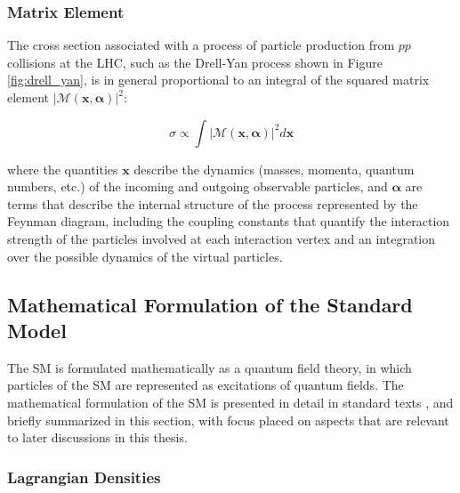 \subsubsection{Matrix Element}


The cross section associated with a process of particle production from \(pp\) collisions at the LHC, such as the Drell-Yan process shown in Figure \ref{fig:drell_yan}, is in general proportional to an integral of the squared matrix element \(|\mathcal{M(\boldsymbol{x}, \boldsymbol{\alpha})}|^2\):

\begin{equation}
\label{eq:matrix_element}
\sigma \propto \int|\mathcal{M(\boldsymbol{x}, \boldsymbol{\alpha})}|^2 d\boldsymbol{x} 
\end{equation}

\noindent where the quantities \(\boldsymbol{x}\) describe the dynamics (masses, momenta, quantum numbers, etc.) of the incoming and outgoing observable particles, and \(\boldsymbol{\alpha}\) are terms that describe the internal structure of the process represented by the Feynman diagram, including the coupling constants that quantify the interaction strength of the particles involved at each interaction vertex and an integration over the possible dynamics of the virtual particles. 

\subsection{Mathematical Formulation of the Standard Model}
\label{sec:sm_math}

The SM is formulated mathematically as a quantum field theory, in which particles of the SM are represented as excitations of quantum fields. The mathematical formulation of the SM is presented in detail in standard texts \cite{griffiths_2008, SM_intro}, and briefly summarized in this section, with focus placed on aspects that are relevant to later discussions in this thesis.

\subsubsection{Lagrangian Densities}

